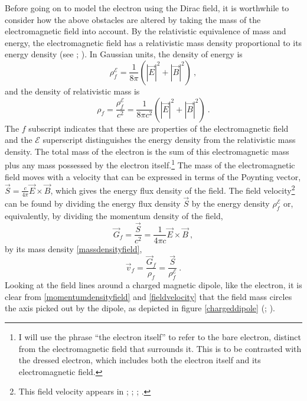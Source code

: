 \documentclass[onecolumn,secnumarabic,amsmath,amssymb,balancelastpage,nofootinbib]{article}
\begin{document}
Before going on to model the electron using the Dirac field, it is worthwhile to consider how the above obstacles are altered by taking the mass of the electromagnetic field into account.  By the relativistic equivalence of mass and energy, the electromagnetic field has a relativistic mass density proportional to its energy density (see \citealp{lange}; \citealp{forcesonfields}).  In Gaussian units, the density of energy is
\begin{equation}
\rho_f^{\mathcal{E}}=\frac{1}{8 \pi}\left(|\vec{E}|^2+|\vec{B}|^2\right)\ ,
\label{energydensityfield}
\end{equation}
and the density of relativistic mass is
\begin{equation}
\rho_f=\frac{\rho_f^{\mathcal{E}}}{c^2}=\frac{1}{8 \pi c^2}\left(|\vec{E}|^2+|\vec{B}|^2\right) \ .
\label{massdensityfield}
\end{equation}
The $f$ subscript indicates that these are properties of the electromagnetic field and the $\mathcal{E}$ superscript distinguishes the energy density from the relativistic mass density.  The total mass of the electron is the sum of this electromagnetic mass plus any mass possessed by the electron itself.\footnote{I will use the phrase ``the electron itself'' to refer to the bare electron, distinct from the electromagnetic field that surrounds it.  This is to be contrasted with the dressed electron, which includes both the electron itself and its electromagnetic field.}  The mass of the electromagnetic field moves with a velocity that can be expressed in terms of the Poynting vector, $\vec{S}= \frac{c}{4\pi} \vec{E} \times \vec{B}$, which gives the energy flux density of the field.  The field velocity\footnote{This field velocity appears in \citet{poincare1900}; \citet[section 12.6.2]{holland}; \citet[box 8.3]{lange}; \citet{forcesonfields}.} can be found by dividing the energy flux density $\vec{S}$ by the energy density $\rho_f^{\mathcal{E}}$ or, equivalently, by dividing the momentum density of the field,
\begin{equation}
\vec{G}_f=\frac{\vec{S}}{c^2}= \frac{1}{4\pi c} \vec{E} \times \vec{B} \ ,
\label{momentumdensityfield}
\end{equation}
by its mass density \eqref{massdensityfield},
\begin{equation}
\vec{v}_f=\frac{\vec{G}_f}{\rho_f}=\frac{\vec{S}}{\rho_f^{\mathcal{E}}}\ .
\label{fieldvelocity}
\end{equation}
Looking at the field lines around a charged magnetic dipole, like the electron, it is clear from \eqref{momentumdensityfield} and \eqref{fieldvelocity} that the field mass circles the axis picked out by the dipole, as depicted in figure \ref{chargeddipole} (\citealp[chapter 27]{feynman2}; \citealp[chapter 8]{lange}).
\end{document}
